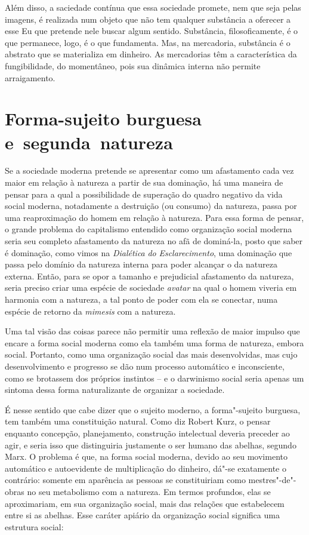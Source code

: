 Além disso, a saciedade contínua que essa sociedade promete, nem que
seja pelas imagens, é realizada num objeto que não tem qualquer
substância a oferecer a esse Eu que pretende nele buscar algum sentido.
Substância, filosoficamente, é o que permanece, logo, é o que fundamenta. Mas, na mercadoria,
substância é o abstrato que se materializa em dinheiro. As mercadorias
têm a característica da fungibilidade, do momentâneo, pois sua dinâmica
interna não permite arraigamento.

\section{Forma-sujeito burguesa e~segunda~natureza}

Se a sociedade moderna pretende se apresentar como um afastamento cada
vez maior em relação à natureza a partir de sua dominação, há uma
maneira de pensar para a qual a possibilidade de superação do quadro
negativo da vida social moderna, notadamente a destruição (ou consumo)
da natureza, passa por uma reaproximação do homem em relação à natureza.
Para essa forma de pensar, o grande problema do capitalismo entendido
como organização social moderna seria seu completo afastamento da
natureza no afã de dominá-la, posto que saber é dominação, como vimos na
\emph{Dialética} \emph{do} \emph{Esclarecimento}, uma dominação que
passa pelo domínio da natureza interna para poder alcançar o da natureza
externa. Então, para se opor a tamanho e prejudicial afastamento da
natureza, seria preciso criar uma espécie de sociedade \emph{avatar} na
qual o homem viveria em harmonia com a natureza, a tal ponto de poder
com ela se conectar, numa espécie de retorno da \emph{mimesis} com a
natureza.

Uma tal visão das coisas parece não permitir uma reflexão de maior
impulso que encare a forma social moderna como ela também uma forma de
natureza, embora social. Portanto, como uma organização social das mais
desenvolvidas, mas cujo desenvolvimento e progresso se dão num processo
automático e inconsciente, como se brotassem dos próprios instintos -- e
o darwinismo social seria apenas um sintoma dessa forma
naturalizante de organizar a sociedade.

É nesse sentido que cabe dizer que o sujeito moderno, a forma"-sujeito
burguesa, tem também uma constituição natural. Como diz Robert Kurz, o
pensar enquanto concepção, planejamento, construção intelectual deveria
preceder ao agir, e seria isso que distinguiria justamente o ser humano
das abelhas, segundo Marx. O problema é que, na forma
social moderna, devido ao seu movimento automático e autoevidente de
multiplicação do dinheiro, dá"-se exatamente o contrário: somente em
aparência as pessoas se constituiriam como mestres"-de"-obras no seu
metabolismo com a natureza. Em termos profundos, elas se aproximariam,
em sua organização social, mais das relações que estabelecem entre si as
abelhas. Esse caráter apiário da organização social significa uma
estrutura social:

